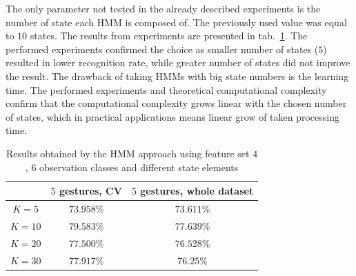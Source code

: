 The only parameter not tested in the already described experiments is the number of state each HMM is composed of. 
The previously used value was equal to $10$ states.
The results from experiments are presented in tab.~\ref{tab:dyn3}. 
The performed experiments confirmed the choice as smaller number of states ($5$) resulted in lower recognition rate, while greater number of states did not improve the result.
The drawback of taking HMMs with big state numbers is the learning time. 
The performed experiments and theoretical computational complexity confirm that the computational complexity grows linear with the chosen number of states, which in practical applications means linear grow of taken processing time.


\begin{table}[htp!]
	\label{tab:dyn3}
	\caption{Results obtained by the HMM approach using feature set $4$, $6$ observation classes and different state elements}
    \begin{tabular}{|c|c|c|}
    \hline
    ~                                 & $5$ gestures, CV & $5$ gestures, whole dataset  \\ \hline
	$K = 5$                  	  & $73.958\%$ & $73.611\%$   \\ \hline
    $K = 10$                     & $79.583\%$ & $77.639\%$   \\ \hline
    $K = 20$                    & $77.500\%$ & $76.528\%$   \\ \hline
    $K = 30$                     & $77.917\%$ & $76.25\%$   \\ \hline
    \end{tabular}
\end{table}